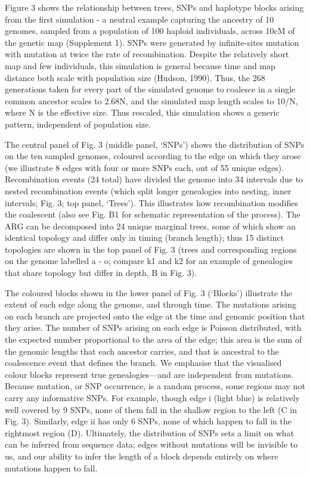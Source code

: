 \documentclass[twocolumn]{bmcart}%
\begin{document}
Figure 3 shows the relationship between trees, SNPs and haplotype blocks arising from the first simulation - a neutral example capturing the ancestry of 10 genomes, sampled from a population of 100 haploid individuals, across 10cM of the genetic map (Supplement 1). SNPs were generated by infinite-sites mutation with mutation at twice the rate of recombination. Despite the relatively short map and few individuals, this simulation is general because time and map distance both scale with population size (Hudson, 1990). Thus, the 268 generations taken for every part of the simulated genome to coalesce in a single common ancestor scales to 2.68N, and the simulated map length scales to 10/N, where N is the effective size. Thus rescaled, this simulation shows a generic pattern, independent of population size. 

The central panel of Fig. 3 (middle panel, ‘SNPs’) shows the distribution of SNPs on the ten sampled genomes, coloured according to the edge on which they arose (we illustrate 8 edges with four or more SNPs each, out of 55 unique edges). Recombination events (24 total) have divided the genome into 34 intervals due to nested recombination events (which split longer genealogies into nesting, inner intervals; Fig. 3; top panel, ‘Trees’). This illustrates how recombination modifies the coalescent (also see Fig. B1 for schematic representation of the process). The ARG can be decomposed into 24 unique marginal trees, some of which show an identical topology and differ only in timing (branch length); thus 15 distinct topologies are shown in the top panel of Fig. 3 (trees and corresponding regions on the genome labelled a - o; compare k1 and k2 for an example of genealogies that share topology but differ in depth, B in Fig. 3).  

The coloured blocks shown in the lower panel of Fig. 3 (‘Blocks’) illustrate the extent of each edge along the genome, and through time. The mutations arising on each branch are projected onto the edge at the time and genomic position that they arise. The number of SNPs arising on each edge is Poisson distributed, with the expected number proportional to the area of the edge; this area is the sum of the genomic lengths that each ancestor carries, and that is ancestral to the coalescence event that defines the branch. We emphasise that the visualised colour blocks represent true genealogies—and are independent from mutations. Because mutation, or SNP occurrence, is a random process, some regions may not carry any informative SNPs. For example, though edge i (light blue) is relatively well covered by 9 SNPs, none of them fall in the shallow region to the left (C in Fig. 3). Similarly, edge ii has only 6 SNPs, none of which happen to fall in the rightmost region (D). Ultimately, the distribution of SNPs sets a limit on what can be inferred from sequence data; edges without mutations will be invisible to us, and our ability to infer the length of a block depends entirely on where mutations happen to fall. 
\end{document}
